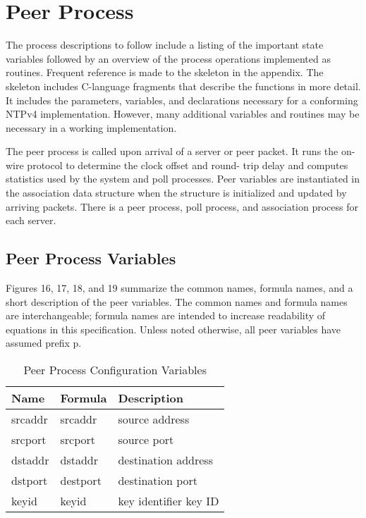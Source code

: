 \chapter{Peer Process}
\label{section-9}

The process descriptions to follow include a listing of the important
state variables followed by an overview of the process operations
implemented as routines. Frequent reference is made to the skeleton
in the appendix. The skeleton includes C-language fragments that
describe the functions in more detail. It includes the parameters,
variables, and declarations necessary for a conforming NTPv4
implementation. However, many additional variables and routines may
be necessary in a working implementation.

The peer process is called upon arrival of a server or peer packet.
It runs the on-wire protocol to determine the clock offset and round-
trip delay and computes statistics used by the system and poll
processes. Peer variables are instantiated in the association data
structure when the structure is initialized and updated by arriving
packets. There is a peer process, poll process, and association
process for each server.

\section{Peer Process Variables}
\label{section-9-1}

Figures 16, 17, 18, and 19 summarize the common names, formula names,
and a short description of the peer variables. The common names and
formula names are interchangeable; formula names are intended to
increase readability of equations in this specification. Unless
noted otherwise, all peer variables have assumed prefix p.

\begin{table}[htb]
  \center
  \begin{tabular}{| l | l | l |}
    \hline
    Name & Formula & Description \\
    \hline
    \hline
    srcaddr & srcaddr & source address \\
    srcport & srcport & source port \\
    dstaddr & dstaddr & destination address \\
    dstport & destport & destination port \\
    keyid & keyid & key identifier key ID \\
    \hline
  \end{tabular}
  \caption{Peer Process Configuration Variables}
  \label{peer_process_configuration_variables}
\end{table}

